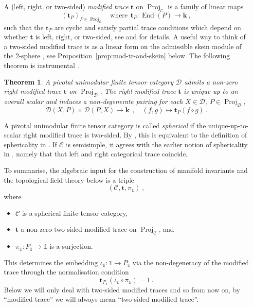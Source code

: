 \documentclass[11pt]{amsart}
\newtheorem{thm}{Theorem}[section]
\theoremstyle{definition}
\numberwithin{equation}{section}
\def\mtr{{\mathbf{t}}} %
\newcommand{\Proj}{\operatorname{Proj}}
\def\cC{\mathcal{C}}
\def\kk{{\bm{k}}}
\def\1{{\mathds{1}}}
\def\to{\rightarrow}
\def\End{{\operatorname{End}}}
\begin{document}
A (left, right, or two-sided) \textit{modified trace} $\mtr$ on $\Proj_{\cC}$ is a family of linear maps
\begin{equation}
    ( \mtr_P )_{P \in \Proj_{\cC}}
    \quad \text{where} ~~
    \mtr_P : \End(P) \to \kk \ ,
\end{equation}
such that the $\mtr_P$ are cyclic and satisfy partial trace conditions which depend on whether $\mtr$ is left, right, or two-sided, see \cite{geer2010generalizedtracemodifieddimension} and \cite[Sec.\,2.2]{GPV13} for details. A useful way to think of a two-sided modified trace is as a linear form on the admissible skein module of the 2-sphere 
\cite{CGPV23}, see Proposition~\ref{prop:mod-tr-and-skein} below.
The following theorem is instrumental \cite[Cor.\,5.6]{GKP22}.

\begin{thm}
A pivotal unimodular finite tensor category $\mathcal{D}$ admits a non-zero right modified trace $\mtr$ on $\Proj_{\mathcal{D}}$. The right modified trace $\mtr$ is unique up to an overall scalar and induces a non-degenerate pairing for each $X \in \mathcal{D}$, $P \in \Proj_{\mathcal{D}}$,
$$
\mathcal{D}(X,P) \times \mathcal{D}(P,X) \to \kk
~~,\quad
(f,g) \mapsto \mtr_P(f \circ g) \ .
$$
\end{thm}

A pivotal unimodular finite tensor category is called \textit{spherical} if the unique-up-to-scalar right modified trace is two-sided.
By \cite[Thm.\,1.3]{Shibata_2021}, this is equivalent to the definition of sphericality in \cite[Def.\,3.5.2]{douglas2018dualizabletensorcategories}. If $\cC$ is semisimple, it agrees with the earlier notion of sphericality in \cite{Barrett:1993zf}, namely that that left and right categorical trace coincide.

\medskip

To summarise, the algebraic input for the construction of manifold invariants and the topological field theory below is a triple
\begin{equation}\label{eq:oc-invariant-alg-input}
    (\cC,\mtr,\pi_\1) \ ,
\end{equation}
where
\begin{itemize}
    \item $\cC$ is a spherical finite tensor category,
    \item $\mtr$ a non-zero two-sided modified trace on $\Proj_{\cC}$, and
    \item $\pi_\1 : P_\1 \to \1$ is a surjection.
\end{itemize}
This determines the embedding $\iota_\1:\1 \to P_\1$ via the non-degeneracy of the modified trace through the normalisation condition
\begin{equation}\label{eq:t-i-pi-norm}
    \mtr_{P_\1}(\iota_\1 \circ \pi_\1) = 1 \ .
\end{equation}
Below we will only deal with two-sided modified traces and so from now on, by ``modified trace'' we will always mean ``two-sided modified trace''.
\end{document}
